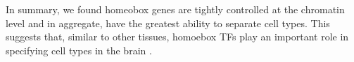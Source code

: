 In summary, we found homeobox genes are tightly controlled at the chromatin level and in aggregate, have the greatest ability to separate cell types. This suggests that, similar to other tissues, homoebox TFs play an important role in specifying cell types in the brain \cite{Kratsios_2017,Zheng_2015,Dasen_2009,Philippidou_2013}.





